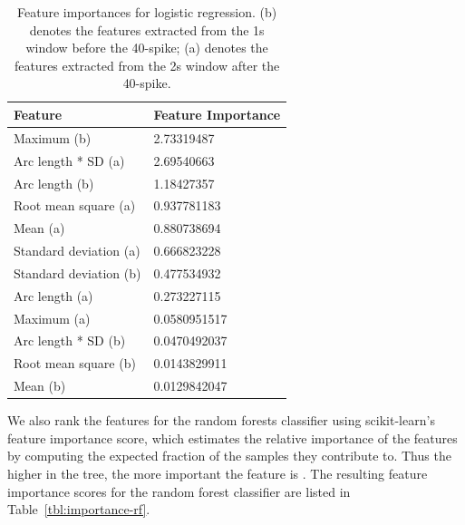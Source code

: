 \documentclass{soups}
\begin{document}
\begin{table}[t]
\centering
\begin{tabular}{@{}ll@{}}
\toprule
Feature                & Feature Importance \\ \midrule
Maximum (b)            & 2.73319487        \\
Arc length * SD (a)    & 2.69540663        \\
Arc length (b)         & 1.18427357        \\
Root mean square (a)   & 0.937781183       \\
Mean (a)               & 0.880738694      \\
Standard deviation (a) & 0.666823228      \\
Standard deviation (b) & 0.477534932      \\
Arc length (a)         & 0.273227115      \\
Maximum (a)            & 0.0580951517     \\
Arc length * SD (b)    & 0.0470492037      \\
Root mean square (b)   & 0.0143829911      \\
Mean (b)               & 0.0129842047     \\ \bottomrule
\end{tabular}
\caption{Feature importances for logistic regression. (b) denotes the features extracted from the 1s window before the 40-spike; (a) denotes the features extracted from the 2s window after the 40-spike.}
\label{tbl:importance-lr}
\end{table}

We also rank the features for the random forests classifier using scikit-learn's feature importance score, which estimates the relative importance of the features by computing the expected fraction of the samples they contribute to. 
Thus the higher in the tree, the more important the feature is \cite{sklearn:rfdoc}. 
The resulting feature importance scores for the random forest classifier are listed in Table~\ref{tbl:importance-rf}.

\end{document}
